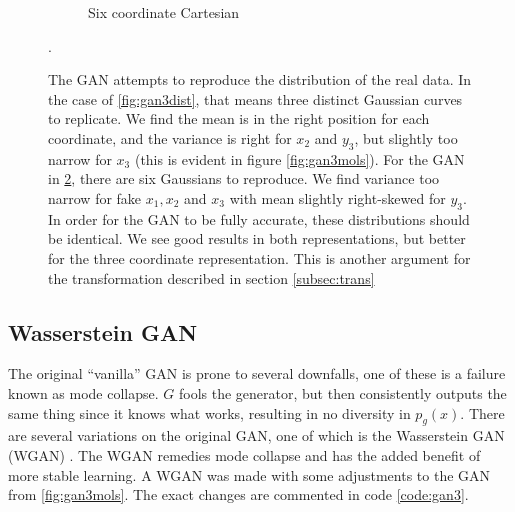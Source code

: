 \documentclass[12pt,a4paper]{article}
\begin{document}
\begin{figure}[h!]
\begin{subfigure}[h]{0.50\textwidth}
        \caption{Six coordinate Cartesian}
        \label{fig:gan6dist}    
    \end{subfigure}    
\caption{The GAN attempts to reproduce the distribution of the real data. In the case of \ref{fig:gan3dist}, that means three distinct Gaussian curves to replicate. We find the mean is in the right position for each coordinate, and the variance is right for $x_2$ and $y_3$, but slightly too narrow for $x_3$ (this is evident in figure \ref{fig:gan3mols}). For the GAN in \ref{fig:gan6dist}, there are six Gaussians to reproduce. We find variance too narrow for fake $x_1, x_2$ and $x_3$ with mean slightly right-skewed for $y_3$. In order for the GAN to be fully accurate, these distributions should be identical. We see good results in both representations, but better for the three coordinate representation. This is another argument for the transformation described in section \ref{subsec:trans}}.
\end{figure}
%
\pagebreak
\subsection{Wasserstein GAN}
The original \enquote{vanilla} GAN is prone to several downfalls, one of these is a failure known as mode collapse. $G$ fools the generator, but then consistently outputs the same thing since it knows what works, resulting in no diversity in $p_g(x)$. There are several variations on the original GAN, one of which is the Wasserstein GAN (WGAN) \cite{arjovsky_wasserstein_2017}. The WGAN remedies mode collapse and has the added benefit of more stable learning.  A WGAN was made with some adjustments to the GAN from \autoref{fig:gan3mols}. The exact changes are commented in code \ref{code:gan3}.
\end{document}
